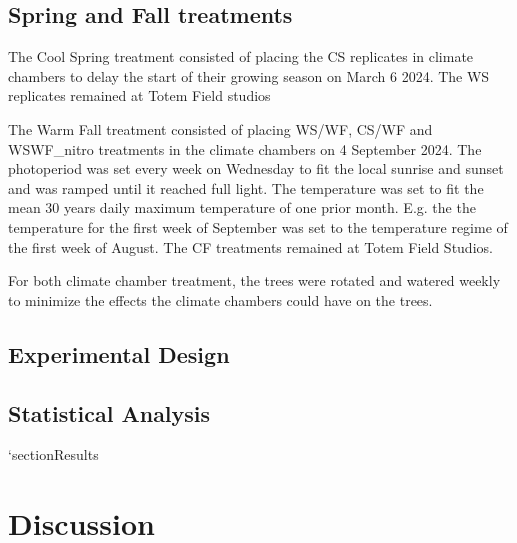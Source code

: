 \documentclass{article}
\begin{document}
\subsection{Spring and Fall treatments}
The Cool Spring treatment consisted of placing the CS replicates in climate chambers to delay the start of their growing season on March 6 2024. The WS replicates remained at Totem Field studios
\par The Warm Fall treatment consisted of placing WS/WF, CS/WF and WSWF\_nitro treatments in the climate chambers on 4 September 2024. The photoperiod was set every week on Wednesday to fit the local sunrise and sunset and was ramped until it reached full light. The temperature was set to fit the mean 30 years daily maximum temperature of one prior month. E.g. the the temperature for the first week of September was set to the temperature regime of the first week of August. The CF treatments remained at Totem Field Studios. 
\par For both climate chamber treatment, the trees were rotated and watered weekly to minimize the effects the climate chambers could have on the trees.

\subsection{Experimental Design}

\subsection{Statistical Analysis}
`section{Results}
\section{Discussion}

\printbibliography
\end{document}
